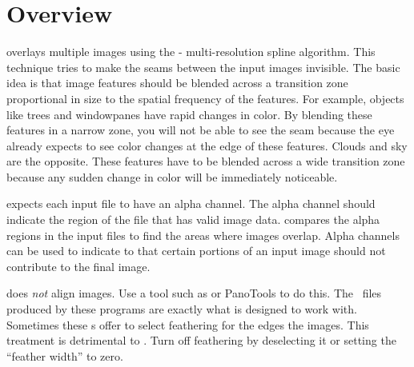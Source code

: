 

\chapter[Overview]{\label{sec:overview}%
  Overview}

%
%
%
%
%
\begin{sloppypar}
  \App{} overlays multiple images using the -
  multi-resolution spline algorithm.\footnotemark{} This technique tries
  to make the seams between the input images invisible.  The basic idea is that image features
  should be blended across a transition zone proportional in size to the spatial frequency of
  the features.  For example, objects like trees and windowpanes have rapid changes in color.
  By blending these features in a narrow zone, you will not be able to see the seam because the
  eye already expects to see color changes at the edge of these features.  Clouds and sky are
  the opposite.  These features have to be blended across a wide transition zone because any
  sudden change in color will be immediately noticeable.%
\end{sloppypar}

%
\App{} expects each input file to have an alpha channel.  The alpha channel should indicate the
region of the file that has valid image data.  \App{} compares the alpha regions in the input
files to find the areas where images overlap.  Alpha channels can be used to indicate to \App{}
that certain portions of an input image should not contribute to the final image.

%
%
%
%
%
\App{} does \emph{not} align images.  Use a tool such as  or PanoTools to do
this.  The ~files produced by these programs are exactly what \App{} is designed
to work with.  Sometimes these s offer to select feathering for the edges the
images.  This treatment is detrimental to \App{}.  Turn off feathering by deselecting it or
setting the ``feather width'' to zero.

